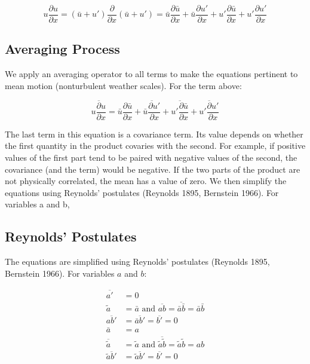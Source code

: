 \documentclass{article}
\begin{document}
\begin{equation}
u\frac{\partial u}{\partial x} = (\bar{u} + u')\frac{\partial}{\partial x}(\bar{u} + u') = \bar{u}\frac{\partial \bar{u}}{\partial x} + \bar{u}\frac{\partial u'}{\partial x} + u'\frac{\partial \bar{u}}{\partial x} + u'\frac{\partial u'}{\partial x}
\label{eq:11}
\end{equation}

\subsection{Averaging Process}
We apply an averaging operator to all terms to make the equations pertinent to mean motion (nonturbulent weather scales).  For the term above:

\begin{equation}
\overline{u\frac{\partial u}{\partial x}} = \bar{u}\frac{\partial \bar{u}}{\partial x} + \overline{\bar{u}\frac{\partial u'}{\partial x}} + \overline{u'\frac{\partial \bar{u}}{\partial x}} + \overline{u'\frac{\partial u'}{\partial x}}
\label{eq:12}
\end{equation}

The last term in this equation is a covariance term. Its value depends on whether the first quantity in the product covaries with the second. For example, if positive values of the first part tend to be paired with negative values of the second, the covariance (and the term) would be negative.  If the two parts of the product are not physically correlated, the mean has a value of zero. We then simplify the equations using Reynolds’ postulates (Reynolds
1895, Bernstein 1966). For variables a and b,

\subsection{Reynolds' Postulates}
The equations are simplified using Reynolds' postulates (Reynolds 1895, Bernstein 1966). For variables $a$ and $b$:

\begin{align}
\overline{a'} &= 0 \label{eq:13} \\
\tilde{a} &= \bar{a} \text{ and } \overline{ab} = \overline{\bar{a}\bar{b}} = \bar{a}\bar{b} \label{eq:14} \\
\overline{ab'} &= \overline{\bar{a}b'} = \overline{b'} = 0 \label{eq:15} \\
\bar{a} &= a \label{eq:16} \\
\overline{\tilde{a}} &= \tilde{a} \text{ and } \overline{\tilde{a}\tilde{b}} = \tilde{a}\tilde{b} = ab \label{eq:17} \\
\overline{\tilde{a}b'} &= \overline{\tilde{a}b'} = \overline{b'} = 0 \label{eq:18}
\end{align}
\end{document}
